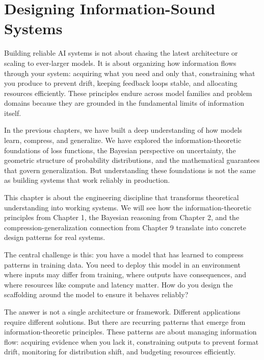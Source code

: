 
\chapter{Designing Information-Sound Systems}

\begin{keyinsight}
Building reliable AI systems is not about chasing the latest architecture or scaling to ever-larger models. It is about organizing how information flows through your system: acquiring what you need and only that, constraining what you produce to prevent drift, keeping feedback loops stable, and allocating resources efficiently. These principles endure across model families and problem domains because they are grounded in the fundamental limits of information itself.
\end{keyinsight}

\vspace{1.5em}

In the previous chapters, we have built a deep understanding of how models learn, compress, and generalize. We have explored the information-theoretic foundations of loss functions, the Bayesian perspective on uncertainty, the geometric structure of probability distributions, and the mathematical guarantees that govern generalization. But understanding these foundations is not the same as building systems that work reliably in production.

This chapter is about the engineering discipline that transforms theoretical understanding into working systems. We will see how the information-theoretic principles from Chapter 1, the Bayesian reasoning from Chapter 2, and the compression-generalization connection from Chapter 9 translate into concrete design patterns for real systems.

The central challenge is this: you have a model that has learned to compress patterns in training data. You need to deploy this model in an environment where inputs may differ from training, where outputs have consequences, and where resources like compute and latency matter. How do you design the scaffolding around the model to ensure it behaves reliably?

The answer is not a single architecture or framework. Different applications require different solutions. But there are recurring patterns that emerge from information-theoretic principles. These patterns are about managing information flow: acquiring evidence when you lack it, constraining outputs to prevent format drift, monitoring for distribution shift, and budgeting resources efficiently.

